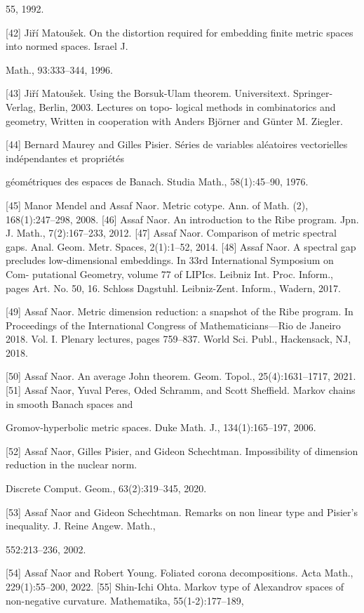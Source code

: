 {55, 1992.

[42] Jiří Matoušek. On the distortion required for embedding ﬁnite metric spaces into normed spaces. Israel J.

Math., 93:333–344, 1996.

[43] Jiří Matoušek. Using the Borsuk-Ulam theorem. Universitext. Springer-Verlag, Berlin, 2003. Lectures on topo-
logical methods in combinatorics and geometry, Written in cooperation with Anders Björner and Günter M.
Ziegler.

[44] Bernard Maurey and Gilles Pisier. Séries de variables aléatoires vectorielles indépendantes et propriétés

géométriques des espaces de Banach. Studia Math., 58(1):45–90, 1976.

[45] Manor Mendel and Assaf Naor. Metric cotype. Ann. of Math. (2), 168(1):247–298, 2008.
[46] Assaf Naor. An introduction to the Ribe program. Jpn. J. Math., 7(2):167–233, 2012.
[47] Assaf Naor. Comparison of metric spectral gaps. Anal. Geom. Metr. Spaces, 2(1):1–52, 2014.
[48] Assaf Naor. A spectral gap precludes low-dimensional embeddings. In 33rd International Symposium on Com-
putational Geometry, volume 77 of LIPIcs. Leibniz Int. Proc. Inform., pages Art. No. 50, 16. Schloss Dagstuhl.
Leibniz-Zent. Inform., Wadern, 2017.

[49] Assaf Naor. Metric dimension reduction: a snapshot of the Ribe program. In Proceedings of the International
Congress of Mathematicians—Rio de Janeiro 2018. Vol. I. Plenary lectures, pages 759–837. World Sci. Publ.,
Hackensack, NJ, 2018.

[50] Assaf Naor. An average John theorem. Geom. Topol., 25(4):1631–1717, 2021.
[51] Assaf Naor, Yuval Peres, Oded Schramm, and Scott Sheﬃeld. Markov chains in smooth Banach spaces and

Gromov-hyperbolic metric spaces. Duke Math. J., 134(1):165–197, 2006.

[52] Assaf Naor, Gilles Pisier, and Gideon Schechtman. Impossibility of dimension reduction in the nuclear norm.

Discrete Comput. Geom., 63(2):319–345, 2020.

[53] Assaf Naor and Gideon Schechtman. Remarks on non linear type and Pisier’s inequality. J. Reine Angew. Math.,

552:213–236, 2002.

[54] Assaf Naor and Robert Young. Foliated corona decompositions. Acta Math., 229(1):55–200, 2022.
[55] Shin-Ichi Ohta. Markov type of Alexandrov spaces of non-negative curvature. Mathematika, 55(1-2):177–189,

}

